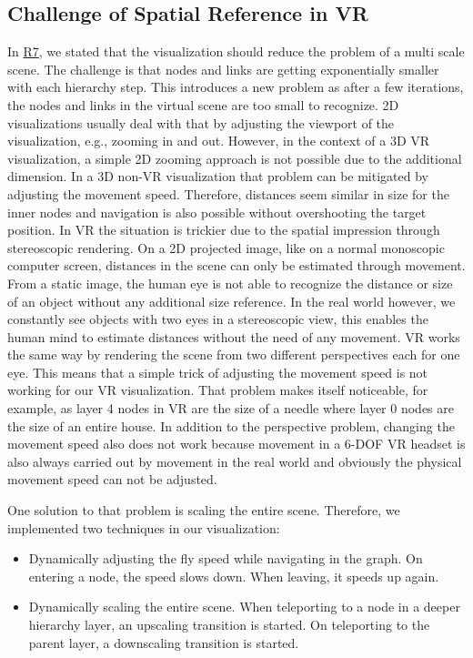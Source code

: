 \subsection{Challenge of Spatial Reference in VR}
\label{chap:ps-spatialReference}
In \hyperref[req:R7]{R7}, we stated that the visualization should reduce the problem of a multi scale scene.
The challenge is that nodes and links are getting exponentially smaller with each hierarchy step.
This introduces a new problem as after a few iterations, the nodes and links in the virtual scene are too small to recognize.
2D visualizations usually deal with that by adjusting the viewport of the visualization, e.g., zooming in and out. 
However, in the context of a 3D VR visualization, a simple 2D zooming approach is not possible due to the additional dimension. 
In a 3D non-VR visualization that problem can be mitigated by adjusting the movement speed. Therefore, distances seem similar in size for the inner nodes and navigation is also possible without overshooting the target position. 
In VR the situation is trickier due to the spatial impression through stereoscopic rendering. On a 2D projected image, like on a normal monoscopic computer screen, distances in the scene can only be estimated through movement. From a static image, the human eye is not able to recognize the distance or size of an object without any additional size reference. 
In the real world however, we constantly see objects with two eyes in a stereoscopic view, this enables the human mind to estimate distances without the need of any movement. VR works the same way by rendering the scene from two different perspectives each for one eye.  
This means that a simple trick of adjusting the movement speed is not working for our VR visualization.
That problem makes itself noticeable, for example, as layer 4 nodes in VR are the size of a needle where layer 0 nodes are the size of an entire house.
In addition to the perspective problem, changing the movement speed also does not work because movement in a 6-DOF VR headset is also always carried out by movement in the real world and obviously the physical movement speed can not be adjusted.

One solution to that problem is scaling the entire scene. Therefore, we implemented two techniques in our visualization:
\begin{itemize}
    \item Dynamically adjusting the fly speed while navigating in the graph. On entering a node, the speed slows down. When leaving, it speeds up again. 
    \item Dynamically scaling the entire scene. When teleporting to a node in a deeper hierarchy layer, an upscaling transition is started. On teleporting to the parent layer, a downscaling transition is started. 
\end{itemize} 


